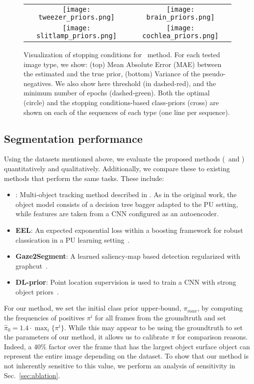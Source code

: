 \begin{figure*}[t]
\caption{Visualization of stopping conditions for \SSnnPU~method. For each tested image type, we show: (top) Mean Absolute Error (MAE) between the estimated and the true prior, (bottom) Variance of the pseudo-negatives. We also show here threshold (in dashed-red), and the minimum number of epochs (dashed-green). Both the optimal (circle) and the stopping conditions-based class-priors (cross) are shown on each of the sequences of each type (one line per sequence). }
\centering
\begin{tabular}{@{}cc@{}}
    \texttt{[image: tweezer\_priors.png]} &
    \texttt{[image: brain\_priors.png]} \\
    \texttt{[image: slitlamp\_priors.png]} &
    \texttt{[image: cochlea\_priors.png]} \\
\end{tabular}
\label{fig:converge}
\end{figure*}

\subsection{Segmentation performance}
\label{sec:exp_performance}
Using the datasets mentioned above, we evaluate the proposed methods (\SSnnPU~and \SSnnPUKSP) quantitatively and qualitatively. Additionally, we compare these to existing methods that perform the same tasks. These include:
\begin{itemize}
\item \KSPTrack: Multi-object tracking method described in \cite{lejeune18}. As in the original work, the object model consists of a decision tree bagger adapted to the PU setting, while features are taken from a CNN configured as an autoencoder.
\item \textbf{EEL}: An expected exponential loss within a boosting framework for robust classication in a PU learning setting~\cite{lejeune17}.
\item \textbf{Gaze2Segment}: A learned saliency-map based detection regularized with graphcut~\cite{khosravan16}.
\item \textbf{DL-prior}: Point location supervision is used to train a CNN with strong object priors~\cite{bearman16}.
\end{itemize}

For our method, we set the initial class prior upper-bound, $\pi_{max}$, by computing the frequencies of positives $\pi^{i}$ for all frames from the groundtruth and set $\hat \pi_{0}=1.4 \cdot \max_{i} \{ \pi^{i} \}$. While this may appear to be using the groundtruth to set the parameters of our method, it allows us to calibrate $\pi$ for comparison reasons. Indeed, a 40\% factor over the frame that has the largest object surface object can represent the entire image depending on the dataset. To show that our method is not inherently sensitive to this value, we perform an analysis of sensitivity in Sec.~\ref{sec:ablation}.


